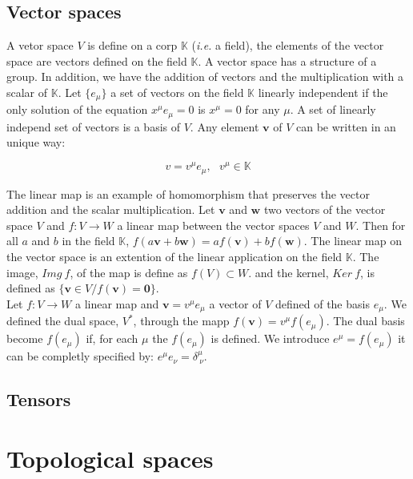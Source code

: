 \documentclass[final, paper=letter,5p,times,twocolumn]{elsarticle}
\theoremstyle{definition}
\begin{document}
\subsection{Vector spaces}

A vetor space $V$ is define on a corp $\mathbb{K}$ ({\it i.e.} a field), the elements of the vector space are vectors defined on the field $\mathbb{K}$. A vector space has a structure of a group. In addition, we have the addition of vectors and the multiplication with a scalar of $\mathbb{K}$. Let $\{e_{\mu}\}$ a set of vectors on the field $\mathbb{K}$ linearly independent if the only solution of the equation $x^{\mu}e_{\mu} = 0$ is $x^{\mu} = 0$ for any $\mu$. A set of linearly independ set of vectors is a basis of $V$. Any element $\bm{v}$ of $V$ can be written in an unique way:

$$
v = v^{\mu}e_{\mu},~~~v^{\mu} \in \mathbb{K}
$$

The linear map is an example of homomorphism that preserves the vector addition and the scalar multiplication. Let $\bm{v}$ and $\bm{w}$ two vectors of the vector space $V$ and $f : V \rightarrow W$ a linear map between the vector spaces $V$ and $W$. Then for all $a$ and $b$ in the field $\mathbb{K}$, $f(a\bm{v} + b\bm{w}) = af(\bm{v}) + bf(\bm{w})$. The linear map on the vector space is an extention of the linear application on the field $\mathbb{K}$. The image, $Img~f$, of the map is define as $f(V) \subset W$. and the kernel, $Ker~f$, is defined as $\{ \bm{v} \in V / f(\bm{v}) = \bm{0}\}$. \\
Let $f : V \rightarrow W$ a linear map and $\bm{v} = v^{\mu} e_{\mu}$ a vector of $V$ defined of the basis $e_{\mu}$. We defined the dual space, $V^{*}$, through the mapp $f(\bm{v}) = v^{\mu} f(e_{\mu})$. The dual basis become $f(e_{\mu})$ if, for each $\mu$ the $f(e_{\mu})$ is defined. We introduce $e^{\mu} = f(e_{\mu})$ it can be completly specified by: $e^{\mu}e_{\nu} = \delta_{~\nu}^{\mu}$.

\subsection{Tensors}

\section{Topological spaces}
\end{document}
